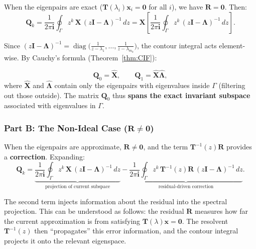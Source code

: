 \documentclass[12pt,a4paper]{article}
\theoremstyle{definition}
\DeclareMathOperator{\diag}{diag}
\newcommand{\key}[1]{\textcolor{keypoint}{\textbf{#1}}}
\begin{document}
When the eigenpairs are exact ($\mathbf{T}(\lambda_i)\mathbf{x}_i = \mathbf{0}$ for all $i$), we have $\mathbf{R} = \mathbf{0}$. Then:
\begin{equation}\label{eq:Qk_ideal}
\mathbf{Q}_k = \frac{1}{2\pi\mathbf{i}} \oint_{\Gamma} z^{k}\,\mathbf{X}\,(z\mathbf{I} - \mathbf{\Lambda})^{-1}\,dz
= \mathbf{X}\left[\frac{1}{2\pi\mathbf{i}} \oint_{\Gamma} z^{k}\,(z\mathbf{I} - \mathbf{\Lambda})^{-1}\,dz\right].
\end{equation}

Since $(z\mathbf{I} - \mathbf{\Lambda})^{-1} = \diag\bigl(\frac{1}{z-\lambda_1}, \ldots, \frac{1}{z-\lambda_{m_0}}\bigr)$, the contour integral acts element-wise. By Cauchy's formula (Theorem~\ref{thm:CIF}):

\begin{equation}\label{eq:Qk_result_ideal}
\boxed{\mathbf{Q}_0 = \hat{\mathbf{X}}, \qquad \mathbf{Q}_1 = \hat{\mathbf{X}}\hat{\mathbf{\Lambda}}},
\end{equation}
where $\hat{\mathbf{X}}$ and $\hat{\mathbf{\Lambda}}$ contain only the eigenpairs with eigenvalues inside $\Gamma$ (filtering out those outside). The matrix $\mathbf{Q}_0$ thus \key{spans the exact invariant subspace} associated with eigenvalues in $\Gamma$.

\subsubsection*{Part B: The Non-Ideal Case ($\mathbf{R} \neq \mathbf{0}$)}

When the eigenpairs are approximate, $\mathbf{R} \neq \mathbf{0}$, and the term $\mathbf{T}^{-1}(z)\mathbf{R}$ provides a \textbf{correction}. Expanding:
\begin{equation}\label{eq:Qk_correction}
\mathbf{Q}_k = \underbrace{\frac{1}{2\pi\mathbf{i}} \oint_{\Gamma} z^{k}\,\mathbf{X}\,(z\mathbf{I} - \mathbf{\Lambda})^{-1}\,dz}_{\text{projection of current subspace}}
- \underbrace{\frac{1}{2\pi\mathbf{i}} \oint_{\Gamma} z^{k}\,\mathbf{T}^{-1}(z)\mathbf{R}\,(z\mathbf{I} - \mathbf{\Lambda})^{-1}\,dz}_{\text{residual-driven correction}}.
\end{equation}

The second term injects information about the residual into the spectral projection. This can be understood as follows: the residual $\mathbf{R}$ measures how far the current approximation is from satisfying $\mathbf{T}(\lambda)\mathbf{x} = \mathbf{0}$. The resolvent $\mathbf{T}^{-1}(z)$ then ``propagates'' this error information, and the contour integral projects it onto the relevant eigenspace.
\end{document}
